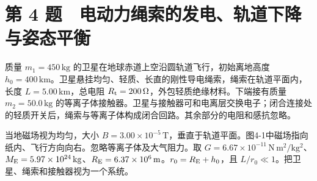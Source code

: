 \documentclass[12pt,a4paper,fontset=fandol]{ctexart}
\begin{document}
\clearpage

\section{第 4
题　电动力绳索的发电、轨道下降与姿态平衡}\label{ux7b2c-4-ux9898-ux7535ux52a8ux529bux7ef3ux7d22ux7684ux53d1ux7535ux8f68ux9053ux4e0bux964dux4e0eux59ffux6001ux5e73ux8861}

质量 \(m_1=450\,\mathrm{kg}\)
的卫星在地球赤道上空沿圆轨道飞行，初始离地高度
\(h_0=400\,\mathrm{km}\)。卫星悬挂均匀、轻质、长直的刚性导电绳索，绳索在轨道平面内，长度
\(L=5.00\,\mathrm{km}\)，总电阻
\(R_{\rm t}=200\,\Omega\)，外包轻质绝缘材料。下端接有质量
\(m_2=50.0\,\mathrm{kg}\)
的等离子体接触器。卫星与接触器可和电离层交换电子；闭合连接处的轻质开关后，绳索与等离子体构成闭合回路。其余部分的电阻和感抗忽略。

当地磁场视为均匀，大小
\(B=3.00\times10^{-5}\,\mathrm T\)，垂直于轨道平面。图4-1中磁场指向纸内、飞行方向向右。忽略等离子体及大气阻力。取
\(G=6.67\times10^{-11}\,\mathrm{N\,m^2/kg^2}\)、\(M_{\rm E}=5.97\times10^{24}\,\mathrm{kg}\)、\(R_{\rm E}=6.37\times10^6\,\mathrm m\)。\(r_0=R_{\rm E}+h_0\)，且
\(L/r_0\ll1\)。把卫星、绳索和接触器视为一个系统。

\begin{center}
\begin{minipage}{\linewidth}
\centering\begingroup
{}
\ifdim\wd\diagrambox>.88\linewidth
\sbox{\diagrambox}{\resizebox{.88\linewidth}{!}{\usebox{\diagrambox}}}
\fi
\ifdim\ht\diagrambox>.29\textheight
\resizebox{!}{.29\textheight}{\usebox{\diagrambox}}
\else\usebox{\diagrambox}\fi
\par{}
\endgroup\end{minipage}
\end{center}
\end{document}
